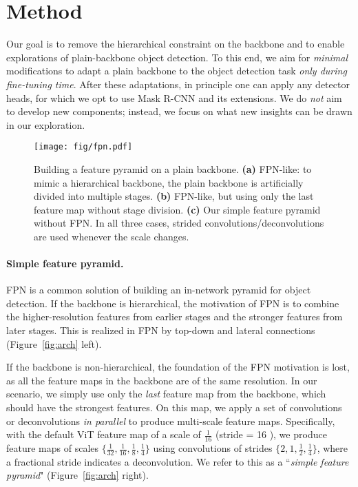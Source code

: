 \documentclass[runningheads]{llncs}
\begin{document}
\section{Method}\label{sec:method}

Our goal is to remove the hierarchical constraint on the backbone and to enable explorations of plain-backbone object detection. To this end, we aim for \textit{minimal} modifications to adapt a plain backbone to the object detection task \textit{only during fine-tuning time}.
After these adaptations, in principle one can apply any detector heads, for which we opt to use Mask R-CNN \cite{He2017} and its extensions. We do \textit{not} aim to develop new components; instead, we focus on what new insights can be drawn in our exploration.


\begin{figure}[t]
    \centering
    \texttt{[image: fig/fpn.pdf]}
    \vspace{-1.5em}
    \caption{Building a feature pyramid on a plain backbone. \textbf{(a)} FPN-like: to mimic a hierarchical backbone, the plain backbone is artificially divided into multiple stages. \textbf{(b)} FPN-like, but using only the last feature map without stage division. \textbf{(c)} Our simple feature pyramid without FPN. In all three cases, strided convolutions/deconvolutions are used whenever the scale changes. 
    }
    \label{fig:fpn}
\end{figure}

\paragraph{Simple feature pyramid.}

FPN \cite{Lin2017} is a common solution of building an \mbox{in-network} pyramid for object detection. If the backbone is hierarchical, the motivation of FPN is to combine the higher-resolution features from earlier stages and the stronger features from later stages. This is realized in FPN by top-down and lateral connections \cite{Lin2017} (Figure~\ref{fig:arch} left).

If the backbone is non-hierarchical, the foundation of the FPN motivation is lost, as all the feature maps in the backbone are of the same resolution. In our scenario, we simply use only the \textit{last} feature map from the backbone, which should have the strongest features. On this map, we apply a set of convolutions or deconvolutions \textit{in parallel} to produce multi-scale feature maps. Specifically, with the default ViT feature map of a scale of $\frac{1}{16}$ (stride = 16 \cite{Dosovitskiy2021}), we produce feature maps of scales $\{\frac{1}{32}, \frac{1}{16}, \frac{1}{8}, \frac{1}{4}\}$ using convolutions of strides $\{2, 1, \frac{1}{2}, \frac{1}{4}\}$, where a fractional stride indicates a deconvolution. We refer to this as a ``\textit{simple feature pyramid}" (Figure~\ref{fig:arch} right).
\end{document}
